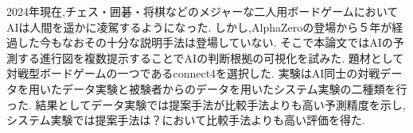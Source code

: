 \abstract
2024年現在,チェス・囲碁・将棋などのメジャーな二人用ボードゲームにおいてAIは人間を遥かに凌駕するようになった\cite{Nikkei}\cite{deepBlue}\cite{dennou}.
しかし,AlphaZero\cite{AlphaZero}の登場から５年が経過した今もなおその十分な説明手法は登場していない.
そこで本論文ではAIの予測する進行図を複数提示することでAIの判断根拠の可視化を試みた.
題材として対戦型ボードゲームの一つであるconnect4を選択した.
実験はAI同士の対戦データを用いたデータ実験と被験者からのデータを用いたシステム実験の二種類を行った.
結果としてデータ実験では提案手法が比較手法よりも高い予測精度を示し,システム実験では提案手法は？において比較手法よりも高い評価を得た.